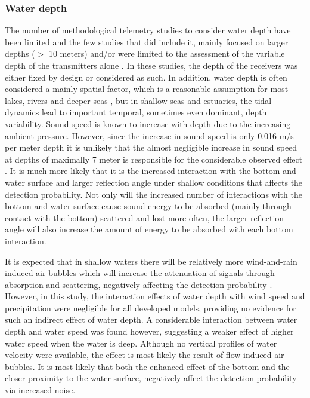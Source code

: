 \documentclass[doublespacing,linenumbers]{bmcart}
\begin{document}
\subsubsection*{Water depth}

The number of methodological telemetry studies to consider water depth have been limited and the few studies that did include it, mainly focused on larger depths ($>$ 10 meters) \cite{Loher2017AUSA} and/or were limited to the assessment of the variable depth of the transmitters alone \cite{Gjelland2013EnvironmentalTransmission,Ottera2016InfluenceFarms}. In these studies, the depth of the receivers was either fixed by design or considered as such. In addition, water depth is often considered a mainly spatial factor, which is a reasonable assumption for most lakes, rivers and deeper seas \cite{Brownscombe2019}, but in shallow seas and estuaries, the tidal dynamics lead to important temporal, sometimes even dominant, depth variability. Sound speed is known to increase with depth due to the increasing ambient pressure. However, since the increase in sound speed is only 0.016 m/s per meter depth it is unlikely that the almost negligible increase in sound speed at depths of maximally 7 meter is responsible for the considerable observed effect \cite{Medwin1998FundamentalsOceanography}. It is much more likely that it is the increased interaction with the bottom and water surface and larger reflection angle under shallow conditions that affects the detection probability. Not only will the increased number of interactions with the bottom and water surface cause sound energy to be absorbed (mainly through contact with the bottom) scattered and lost more often, the larger reflection angle will also increase the amount of energy to be absorbed with each bottom interaction. 

It is expected that in shallow waters there will be relatively more wind-and-rain induced air bubbles which will increase the attenuation of signals through absorption and scattering, negatively affecting the detection probability \cite{Gjelland2013EnvironmentalTransmission,Winter2021DetectionSystem}. However, in this study, the interaction effects of water depth with wind speed and precipitation were negligible for all developed models, providing no evidence for such an indirect effect of water depth. A considerable interaction between water depth and water speed was found however, suggesting a weaker effect of higher water speed when the water is deep. Although no vertical profiles of water velocity were available, the effect is most likely the result of flow induced air bubbles. It is most likely that both the enhanced effect of the bottom and the closer proximity to the water surface, negatively affect the detection probability via increased noise. 
\end{document}
